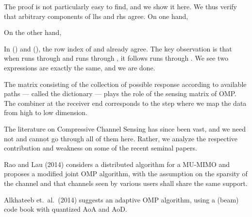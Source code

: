 The proof is not particularly easy to find, and we show it here.
We thus verify that arbitrary components of lhs and rhs agree.
On one hand,


On the other hand,


In () and (), the row index of  and  already agree.
The key observation is that when  runs through  and  runs through , it follows  runs through .
We see two expressions are exactly the same, and we are done.

The matrix consisting of the collection of possible response according to available paths --- called the dictionary --- plays the role of the sensing matrix of OMP.
The combiner at the receiver end corresponds to the step where we map the data from high to low dimension.

\stopsection
\startsection [title={Further Development on Compressive Channel Sensing}]

The literature on Compressive Channel Sensing has since been vast, and we need not and cannot go through all of them here.
Rather, we analyze the respective contribution and weakness on some of the recent seminal papers.

Rao and Lau (2014) considers a distributed algorithm for a MU-MIMO and proposes a modified joint OMP algorithm, with the assumption on the sparsity of the channel and that channels seen by various users shall share the same support.

Alkhateeb et.\ al.\ (2014) suggests an adaptive OMP algorithm, using a (beam) code book with quantized AoA and AoD.

